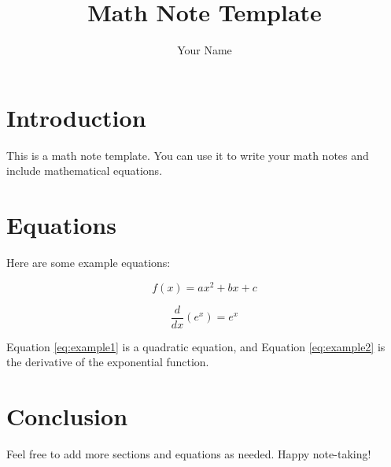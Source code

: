 \documentclass{article}
\title{Math Note Template}
\author{Your Name}
\begin{document}
\maketitle

\section{Introduction}

This is a math note template. You can use it to write your math notes and include mathematical equations.

\section{Equations}

Here are some example equations:

\begin{equation}
    \label{eq:example1}
    f(x) = ax^2 + bx + c
\end{equation}

\begin{equation}
    \label{eq:example2}
    \frac{d}{dx} \left( e^x \right) = e^x
\end{equation}

Equation \ref{eq:example1} is a quadratic equation, and Equation \ref{eq:example2} is the derivative of the exponential function.

\section{Conclusion}

Feel free to add more sections and equations as needed. Happy note-taking!
\end{document}
